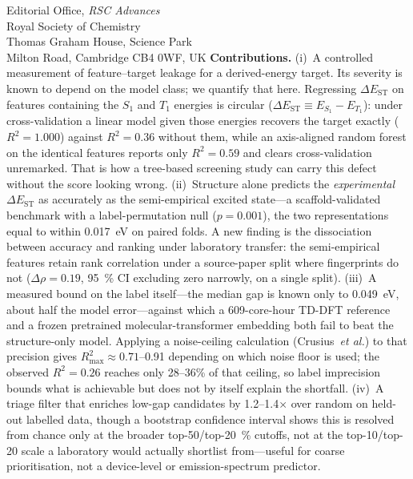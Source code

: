 \documentclass[12pt,a4paper]{letter}
\begin{document}
\begin{letter}{
  Editorial Office, \textit{RSC Advances}\\
  Royal Society of Chemistry\\
  Thomas Graham House, Science Park\\
  Milton Road, Cambridge CB4 0WF, UK
}
\textbf{Contributions.}
(i)~A controlled measurement of feature--target leakage for a derived-energy target.
Its severity is known to depend on the model class; we quantify that here. Regressing
$\Delta E_\text{ST}$ on features
containing the $S_1$ and $T_1$ energies is circular
($\Delta E_\text{ST}\equiv E_{S_1}-E_{T_1}$): under cross-validation a linear model
given those energies recovers the target exactly ($R^2 = 1.000$) against $R^2 = 0.36$
without them, while an axis-aligned random forest on the identical features reports
only $R^2 = 0.59$ and clears cross-validation unremarked. That is how a tree-based
screening study can carry this defect without the score looking wrong.
(ii)~Structure alone predicts the \emph{experimental} $\Delta E_\text{ST}$ as
accurately as the semi-empirical excited state---a scaffold-validated benchmark with
a label-permutation null ($p = 0.001$), the two representations equal to within
\qty{0.017}{\electronvolt} on paired folds. A new finding is the
dissociation between accuracy and ranking under laboratory transfer: the
semi-empirical features retain rank correlation under a source-paper split where
fingerprints do not ($\Delta\rho = \num{0.19}$, \qty{95}{\percent} CI excluding zero
narrowly, on a single split).
(iii)~A measured bound on the label itself---the median gap is known only to
\num{0.049}~eV, about half the model error---against which a \num{609}-core-hour
TD-DFT reference and a frozen pretrained molecular-transformer embedding both fail
to beat the structure-only model. Applying a noise-ceiling calculation
(Crusius~\textit{et al.}) to that precision gives $R^2_\text{max} \approx
0.71$--\num{0.91} depending on which noise floor is used; the observed $R^2 =
0.26$ reaches only \num{28}--\num{36}\% of that ceiling, so label imprecision
bounds what is achievable but does not by itself explain the shortfall.
(iv)~A triage filter that enriches low-gap candidates by
\num{1.2}--\num{1.4}$\times$ over random on held-out labelled data, though a
bootstrap confidence interval shows this is resolved from chance only at the
broader top-\num{50}/top-\qty{20}{\percent} cutoffs, not at the top-\num{10}/top-\num{20}
scale a laboratory would actually shortlist from---useful for coarse
prioritisation, not a device-level or emission-spectrum predictor.


\end{letter}
\end{document}
